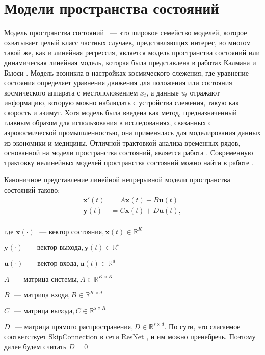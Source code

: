 \documentclass[a4paper, 12pt]{article}
\newcommand{\bx}{\mathbf{x}}
\newcommand{\by}{\mathbf{y}}
\newcommand{\bu}{\mathbf{u}}
\newcommand{\dR}{\mathds{R}}
\begin{document}
	\section{Модели пространства состояний}
	Модель пространства состояний ~--- это широкое семейство моделей, которое охватывает целый класс частных случаев, представляющих интерес, во многом такой же, как и линейная регрессия, является модель пространства состояний или динамическая линейная модель, которая была представлена в работах Калмана и Бьюси \citep{kalman1961}.
	Модель возникла в настройках космического слежения, где уравнение состояния определяет уравнения движения для положения или состояния космического аппарата с местоположением $x_t$, а данные $u_t$ отражают информацию, которую можно наблюдать с устройства слежения, такую как скорость и азимут.
	Хотя модель была введена как метод, предназначенный главным образом для использования в исследованиях, связанных с аэрокосмической промышленностью, она применялась для моделирования данных из экономики \citep{harrison1976bayesian, harvey1984estimating, harvey1983forecasting} и медицины.
	Отличной трактовкой анализа временных рядов, основанной на модели пространства состояний, является работа \citep{durbin2002simple}. Современную трактовку нелинейных моделей пространства состояний можно найти в работе \citep{douc2014nonlinear}.
	
	Каноничное представление линейной непрерывной модели пространства состояний таково:
	\begin{equation}\label{eq:ssm-cont}
		\begin{aligned}
			\bx'(t) &= A\bx(t) + B\bu(t) \\
			\by(t) &= C\bx(t) + D\bu(t), \\
		\end{aligned}
	\end{equation}

	где 
	$\bx(\cdot) \text{ ~--- вектор состояния}, \bx(t) \in \dR^K$
	
	$\by(\cdot) \text{ ~--- вектор выхода}, \by(t) \in \dR^s$
	
	$\bu(\cdot) \text{ ~--- вектор входа}, \bu(t) \in \dR^d$
	
	$A \text{ ~--- матрица системы}, A \in \dR^{K \times K}$
	
	$B \text{ ~--- матрица входа}, B \in \dR^{K \times d}$
	
	$C \text{ ~--- матрица выхода}, C \in \dR^{s \times K}$
	
	$D \text{ ~--- матрица прямого распространения}, D \in \dR^{s \times d}$. По сути, это слагаемое соответствует SkipConnection в сети ResNet \citep{temp_he2016deep}, и им можно пренебречь. Поэтому далее будем считать $D = 0$
	
\end{document}
